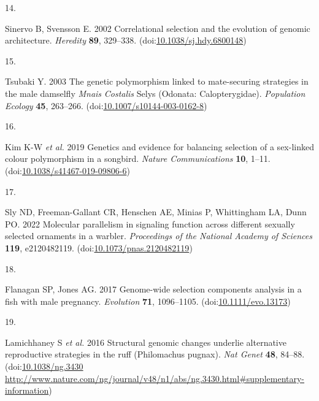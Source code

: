 \documentclass[
  11pt,
  a4paper,
]{article}
\newlength{\cslhangindent}
\newlength{\csllabelwidth}
\newlength{\cslentryspacingunit} %
\newenvironment{CSLReferences}[2] %
 {%
  \setlength{\parindent}{0pt}
  \ifodd #1
  \let\oldpar\par
  \def\par{\hangindent=\cslhangindent\oldpar}
  \fi
  \setlength{\parskip}{#2\cslentryspacingunit}
 }%
 {}
\newcommand{\CSLLeftMargin}[1]{\parbox[t]{\csllabelwidth}{#1}}
\newcommand{\CSLRightInline}[1]{\parbox[t]{\linewidth - \csllabelwidth}{#1}\break}
\begin{document}
\begin{CSLReferences}{0}{0}
\leavevmode{}%
\CSLLeftMargin{14. }%
\CSLRightInline{Sinervo B, Svensson E. 2002 Correlational selection and the evolution of genomic architecture. \emph{Heredity} \textbf{89}, 329--338. (doi:\href{https://doi.org/10.1038/sj.hdy.6800148}{10.1038/sj.hdy.6800148})}

\leavevmode{}%
\CSLLeftMargin{15. }%
\CSLRightInline{Tsubaki Y. 2003 The genetic polymorphism linked to mate-securing strategies in the male damselfly {\emph{Mnais}}{ \emph{Costalis}} {Selys} ({Odonata}: {Calopterygidae}). \emph{Population Ecology} \textbf{45}, 263--266. (doi:\href{https://doi.org/10.1007/s10144-003-0162-8}{10.1007/s10144-003-0162-8})}

\leavevmode{}%
\CSLLeftMargin{16. }%
\CSLRightInline{Kim K-W \emph{et al.} 2019 Genetics and evidence for balancing selection of a sex-linked colour polymorphism in a songbird. \emph{Nature Communications} \textbf{10}, 1--11. (doi:\href{https://doi.org/10.1038/s41467-019-09806-6}{10.1038/s41467-019-09806-6})}

\leavevmode{}%
\CSLLeftMargin{17. }%
\CSLRightInline{Sly ND, Freeman-Gallant CR, Henschen AE, Minias P, Whittingham LA, Dunn PO. 2022 Molecular parallelism in signaling function across different sexually selected ornaments in a warbler. \emph{Proceedings of the National Academy of Sciences} \textbf{119}, e2120482119. (doi:\href{https://doi.org/10.1073/pnas.2120482119}{10.1073/pnas.2120482119})}

\leavevmode{}%
\CSLLeftMargin{18. }%
\CSLRightInline{Flanagan SP, Jones AG. 2017 Genome-wide selection components analysis in a fish with male pregnancy. \emph{Evolution} \textbf{71}, 1096--1105. (doi:\href{https://doi.org/10.1111/evo.13173}{10.1111/evo.13173})}

\leavevmode{}%
\CSLLeftMargin{19. }%
\CSLRightInline{Lamichhaney S \emph{et al.} 2016 Structural genomic changes underlie alternative reproductive strategies in the ruff ({Philomachus} pugnax). \emph{Nat Genet} \textbf{48}, 84--88. (doi:\href{10.1038/ng.3430\%20http://www.nature.com/ng/journal/v48/n1/abs/ng.3430.html\#supplementary-information}{10.1038/ng.3430 http://www.nature.com/ng/journal/v48/n1/abs/ng.3430.html\#supplementary-information})}


\end{CSLReferences}
\end{document}
